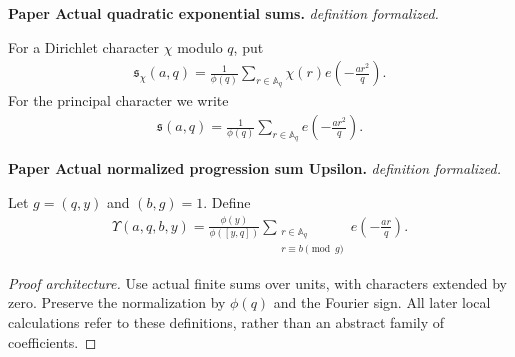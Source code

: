 \begin{definition}
\label{QuadraticSums}
\leanok
\par\medskip\noindent\textbf{Paper Actual quadratic exponential sums.} \textit{definition formalized.}\par
For a Dirichlet character $\chi$ modulo $q$, put
\begin{align}
 \mathfrak s_\chi(a,q)
 =\frac1{\phi(q)}\sum_{r\in\mathbb A_q}
 \chi(r)e\left(-\frac{ar^2}{q}\right).
\end{align}
For the principal character we write
\begin{align}
 \mathfrak s(a,q)
 =\frac1{\phi(q)}\sum_{r\in\mathbb A_q}
 e\left(-\frac{ar^2}{q}\right).
\end{align}
\par\medskip\noindent\textbf{Paper Actual normalized progression sum Upsilon.} \textit{definition formalized.}\par
Let $g=(q,y)$ and $(b,g)=1$.  Define
\begin{align}
 \Upsilon(a,q,b,y)=\frac{\phi(y)}{\phi([y,q])}
 \sum_{\substack{r\in\mathbb A_q\\r\equiv b\pmod g}}
 e\left(-\frac{ar}{q}\right).
\end{align}
\end{definition}
\begin{proof}[Proof architecture]
\leanok
Use actual finite sums over units, with characters extended by zero. Preserve the normalization by $\phi(q)$ and the Fourier sign. All later local calculations refer to these definitions, rather than an abstract family of coefficients.
\end{proof}

